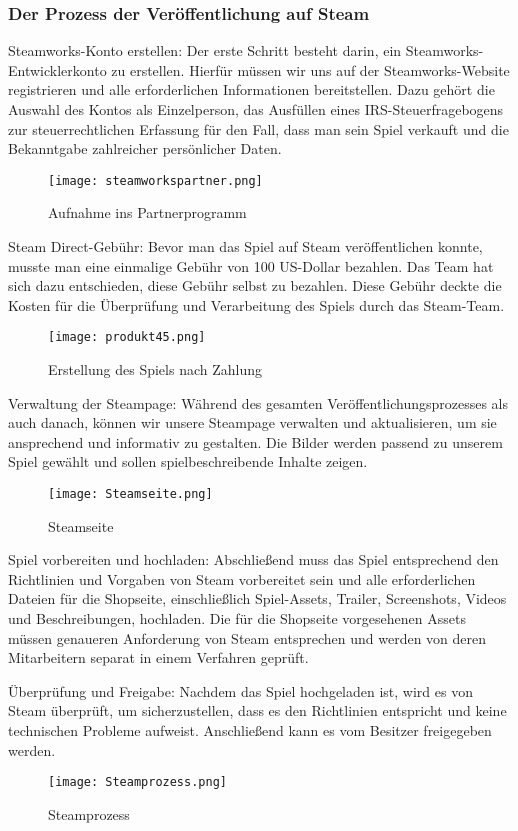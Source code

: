 \subsubsection{Der Prozess der Veröffentlichung auf Steam}\label{subsubsec:Veröffentlichungsprozess}

Steamworks-Konto erstellen:
Der erste Schritt besteht darin, ein Steamworks-Entwicklerkonto zu erstellen.
Hierfür müssen wir uns auf der Steamworks-Website registrieren und alle erforderlichen Informationen bereitstellen.
Dazu gehört die Auswahl des Kontos als Einzelperson, das Ausfüllen eines IRS-Steuerfragebogens zur steuerrechtlichen Erfassung für den Fall, dass man sein Spiel verkauft und die Bekanntgabe zahlreicher persönlicher Daten.
\begin{figure}[H]
    \texttt{[image: steamworkspartner.png]}
    \caption{Aufnahme ins Partnerprogramm}
\end{figure}

Steam Direct-Gebühr:
Bevor man das Spiel auf Steam veröffentlichen konnte, musste man eine einmalige Gebühr von 100 US-Dollar bezahlen.
Das Team hat sich dazu entschieden, diese Gebühr selbst zu bezahlen.
Diese Gebühr deckte die Kosten für die Überprüfung und Verarbeitung des Spiels durch das Steam-Team.
\begin{figure}[H]
    \texttt{[image: produkt45.png]}
    \caption{Erstellung des Spiels nach Zahlung}
\end{figure}

Verwaltung der Steampage: Während des gesamten Veröffentlichungsprozesses als auch danach, können wir unsere Steampage verwalten und aktualisieren, um sie ansprechend und informativ zu gestalten.
Die Bilder werden passend zu unserem Spiel gewählt und sollen spielbeschreibende Inhalte zeigen.
\begin{figure}[H]
    \texttt{[image: Steamseite.png]}
    \caption{Steamseite}
\end{figure}

Spiel vorbereiten und hochladen:
Abschließend muss das Spiel entsprechend den Richtlinien und Vorgaben von Steam vorbereitet sein und alle erforderlichen Dateien für die Shopseite, einschließlich Spiel-Assets, Trailer, Screenshots, Videos und Beschreibungen, hochladen.
Die für die Shopseite vorgesehenen Assets müssen genaueren Anforderung von Steam entsprechen und werden von deren Mitarbeitern separat in einem Verfahren geprüft.

Überprüfung und Freigabe:
Nachdem das Spiel hochgeladen ist, wird es von Steam überprüft, um sicherzustellen, dass es den Richtlinien entspricht und keine technischen Probleme aufweist.
Anschließend kann es vom Besitzer freigegeben werden.
\begin{figure}[H]
    \texttt{[image: Steamprozess.png]}
    \caption{Steamprozess}
\end{figure}


